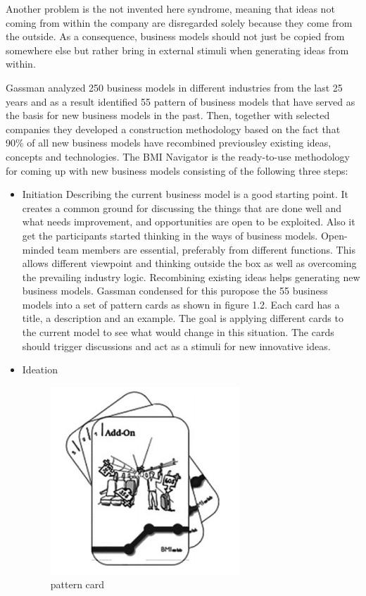\begin{itemize}
\begin{itemize}
				Another problem is the not invented here syndrome, meaning that ideas not coming from within the company are disregarded solely because they come from the outside. As a consequence, business models should not just be copied from somewhere else but rather bring in external stimuli when generating ideas from within.

				Gassman analyzed 250 business models in different industries from the last 25 years and as a result identified 55 pattern of business models that have served as the basis for new business models in the past. Then, together with selected companies they developed a construction methodology based on the fact that 90\% of all new business models have recombined previousley existing ideas, concepts and  technologies.
				The BMI Navigator is the ready-to-use methodology for coming up with new business models consisting of the following three steps:


				\begin{itemize}
				 	\item Initiation
					Describing the current business model is a good starting point. It creates a common ground for discussing the things that are done well and what needs improvement, and opportunities are open to be exploited. Also it get the participants started thinking in the ways of business models.
					Open-minded team members are essential, preferably from different functions. This allows different viewpoint and thinking outside the box as well as overcoming the prevailing industry logic.
					Recombining existing ideas helps generating new business models. Gassman  condensed for this puropose the 55 business models into a set of pattern cards as shown in figure 1.2. Each card has a title, a description and an example. The goal is applying different cards to the current model to see what would change in this situation. The cards should trigger discussions and act as a stimuli for new innovative ideas.

				 \item Ideation


					\begin{figure}[ht]
						    \begin{center}
						    \includegraphics[scale=0.6]{Talk11/Figure2.png}
						    \end{center}
						    \caption{pattern card}
						    \label{label}
						\end{figure}




\end{itemize}
\end{itemize}
\end{itemize}
